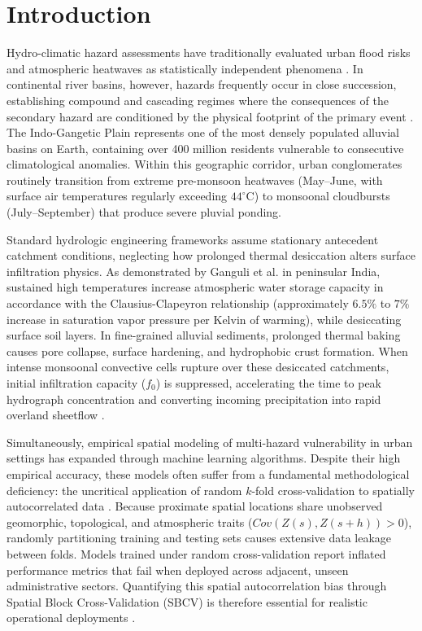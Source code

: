 \documentclass[OA,linenum]{InterPore}
\begin{document}
\maketitle

\section{Introduction}

Hydro-climatic hazard assessments have traditionally evaluated urban flood risks and atmospheric heatwaves as statistically independent phenomena \cite{VanWesten2011, JatoEspino2024}. In continental river basins, however, hazards frequently occur in close succession, establishing compound and cascading regimes where the consequences of the secondary hazard are conditioned by the physical footprint of the primary event \cite{Ganguli2025}. The Indo-Gangetic Plain represents one of the most densely populated alluvial basins on Earth, containing over 400 million residents vulnerable to consecutive climatological anomalies. Within this geographic corridor, urban conglomerates routinely transition from extreme pre-monsoon heatwaves (May--June, with surface air temperatures regularly exceeding $44^\circ\text{C}$) to monsoonal cloudbursts (July--September) that produce severe pluvial ponding.

Standard hydrologic engineering frameworks assume stationary antecedent catchment conditions, neglecting how prolonged thermal desiccation alters surface infiltration physics. As demonstrated by Ganguli et al. \cite{Ganguli2025} in peninsular India, sustained high temperatures increase atmospheric water storage capacity in accordance with the Clausius-Clapeyron relationship (approximately $6.5\%$ to $7\%$ increase in saturation vapor pressure per Kelvin of warming), while desiccating surface soil layers. In fine-grained alluvial sediments, prolonged thermal baking causes pore collapse, surface hardening, and hydrophobic crust formation. When intense monsoonal convective cells rupture over these desiccated catchments, initial infiltration capacity ($f_0$) is suppressed, accelerating the time to peak hydrograph concentration and converting incoming precipitation into rapid overland sheetflow \cite{Rohini2025}.

Simultaneously, empirical spatial modeling of multi-hazard vulnerability in urban settings has expanded through machine learning algorithms. Despite their high empirical accuracy, these models often suffer from a fundamental methodological deficiency: the uncritical application of random $k$-fold cross-validation to spatially autocorrelated data \cite{Roberts2016}. Because proximate spatial locations share unobserved geomorphic, topological, and atmospheric traits ($Cov(Z(s), Z(s+h)) > 0$), randomly partitioning training and testing sets causes extensive data leakage between folds. Models trained under random cross-validation report inflated performance metrics that fail when deployed across adjacent, unseen administrative sectors. Quantifying this spatial autocorrelation bias through Spatial Block Cross-Validation (SBCV) is therefore essential for realistic operational deployments \cite{Roberts2016}.
\end{document}
